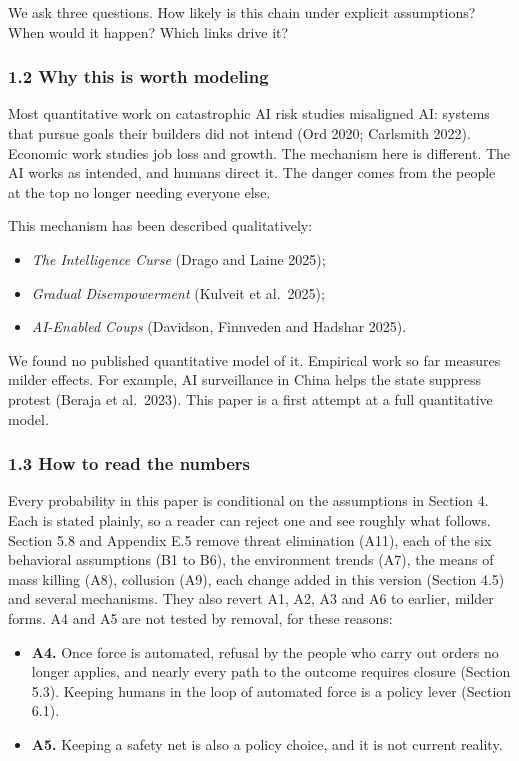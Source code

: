 \documentclass[
  10pt,
]{article}
\providecommand{\tightlist}{%
  \setlength{\itemsep}{0pt}\setlength{\parskip}{0pt}}
\begin{document}
We ask three questions. How likely is this chain under explicit assumptions? When would it happen?
Which links drive it?

\subsubsection{1.2 Why this is worth modeling}\label{why-this-is-worth-modeling}

Most quantitative work on catastrophic AI risk studies misaligned AI: systems that pursue goals
their builders did not intend (Ord 2020; Carlsmith 2022). Economic work studies job loss and growth.
The mechanism here is different. The AI works as intended, and humans direct it. The danger comes
from the people at the top no longer needing everyone else.

This mechanism has been described qualitatively:

\begin{itemize}
\tightlist
\item
  \emph{The Intelligence Curse} (Drago and Laine 2025);
\item
  \emph{Gradual Disempowerment} (Kulveit et al.~2025);
\item
  \emph{AI-Enabled Coups} (Davidson, Finnveden and Hadshar 2025).
\end{itemize}

We found no published quantitative model of it. Empirical work so far measures milder effects. For
example, AI surveillance in China helps the state suppress protest (Beraja et al.~2023). This paper
is a first attempt at a full quantitative model.

\subsubsection{1.3 How to read the numbers}\label{how-to-read-the-numbers}

Every probability in this paper is conditional on the assumptions in Section 4. Each is stated
plainly, so a reader can reject one and see roughly what follows. Section 5.8 and Appendix E.5
remove threat elimination (A11), each of the six behavioral assumptions (B1 to B6), the environment
trends (A7), the means of mass killing (A8), collusion (A9), each change added in this version
(Section 4.5) and several mechanisms. They also revert A1, A2, A3 and A6 to earlier, milder forms.
A4 and A5 are not tested by removal, for these reasons:

\begin{itemize}
\tightlist
\item
  \textbf{A4.} Once force is automated, refusal by the people who carry out orders no longer
  applies, and nearly every path to the outcome requires closure (Section 5.3). Keeping humans in
  the loop of automated force is a policy lever (Section 6.1).
\item
  \textbf{A5.} Keeping a safety net is also a policy choice, and it is not current reality.
\end{itemize}
\end{document}
